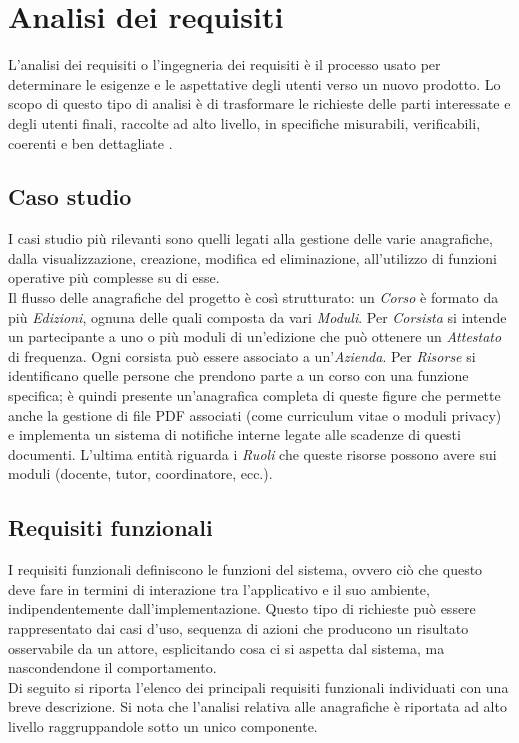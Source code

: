 \chapter{Analisi dei requisiti}
\label{cha:intro}

L'analisi dei requisiti o l'ingegneria dei requisiti è il processo usato per determinare le esigenze e le aspettative degli utenti verso un nuovo prodotto.
Lo scopo di questo tipo di analisi è di trasformare le richieste delle parti interessate e degli utenti finali, raccolte ad alto livello, in specifiche misurabili, verificabili, coerenti e ben dettagliate \cite{req1}\cite{req2}\cite{req3}.



\section{Caso studio}
\label{sec:studio}
I casi studio più rilevanti sono quelli legati alla gestione delle varie anagrafiche, dalla visualizzazione, creazione, modifica ed eliminazione, all'utilizzo di funzioni operative più complesse su di esse.\\
Il flusso delle anagrafiche del progetto è così strutturato: un \textit{Corso} è formato da più \textit{Edizioni}, ognuna delle quali composta da vari \textit{Moduli}. Per \textit{Corsista} si intende un partecipante a uno o più moduli di un'edizione che può ottenere un \textit{Attestato} di frequenza. Ogni corsista può essere associato a un'\textit{Azienda}. Per \textit{Risorse} si identificano quelle persone che prendono parte a un corso con una funzione specifica; è quindi presente un'anagrafica completa di queste figure che permette anche la gestione di file PDF associati (come curriculum vitae o moduli privacy) e implementa un sistema di notifiche interne legate alle scadenze di questi documenti. L'ultima entità riguarda i \textit{Ruoli} che queste risorse possono avere sui moduli (docente, tutor, coordinatore, ecc.).




\section{Requisiti funzionali}
\label{sec:funzionali}
I requisiti funzionali definiscono le funzioni del sistema, ovvero ciò che questo deve fare in termini di interazione tra l'applicativo e il suo ambiente, indipendentemente dall'implementazione. Questo tipo di richieste può essere rappresentato dai casi d'uso, sequenza di azioni che producono un risultato osservabile da un attore, esplicitando cosa ci si aspetta dal sistema, ma nascondendone il comportamento.\\
Di seguito si riporta l'elenco dei principali requisiti funzionali individuati con una breve descrizione. Si nota che l'analisi relativa alle anagrafiche è riportata ad alto livello raggruppandole sotto un unico componente.

